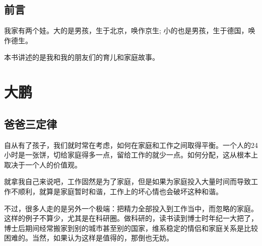 \documentclass[twoside,openright,headings=optiontohead]{ctexbook} %
\begin{document}
	\frontmatter
	\begin{figure}[ht]
		\begin{center}
			
		\end{center}
	\end{figure}
\newpage
{\color{TEXTColor}
	\begin{multicols}{2}
		\tableofcontents
	\end{multicols}
	\newpage
	\mainmatter

\mainmatter

\chapter*{前言}\label{pre}

我家有两个娃。大的是男孩，生于北京，唤作京生;
小的也是男孩，生于德国，唤作德生。

本书讲述的是我和我的朋友们的育儿和家庭故事。

\part{大鹏}\label{dapeng}

\chapter*{爸爸三定律}\label{three-laws}

自从有了孩子，我们就时常在考虑，如何在家庭和工作之间取得平衡。一个人的24小时是一张饼，切给家庭得多一点，留给工作的就少一点。如何分配，这从根本上取决于一个人的价值观。

就拿我自己来说吧，工作固然是为了家庭，但是如果为家庭投入大量时间而导致工作不顺利，就算是家庭暂时和谐，工作上的坏心情也会破坏这种和谐。

不过，很多人走的是另外一个极端：把精力全部投入到工作当中，而忽略的家庭。这样的例子不算少，尤其是在科研圈。做科研的，读书读到博士时年纪一大把了，博士后期间经常搬家到别的城市甚至别的国家，维系稳定的情侣和家庭关系是比较困难的。当然，如果认为这样是值得的，那倒也无妨。

}
\end{document}
